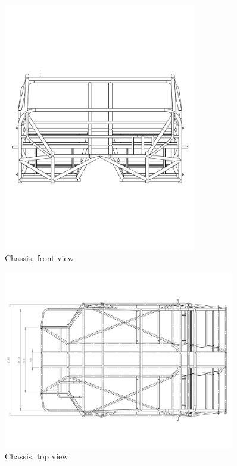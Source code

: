 \documentclass[10pt]{article}
\begin{document}
\begin{figure}
\centering
\includegraphics[width=0.75\textwidth]{figures/chassis-front}
\caption{Chassis, front view}
\label{fig:chassis-front}
\end{figure}

\begin{figure}
\centering
\includegraphics[width=0.9\textwidth]{figures/chassis-top}
\caption{Chassis, top view}
\label{fig:chassis-top}
\end{figure}
\end{document}
